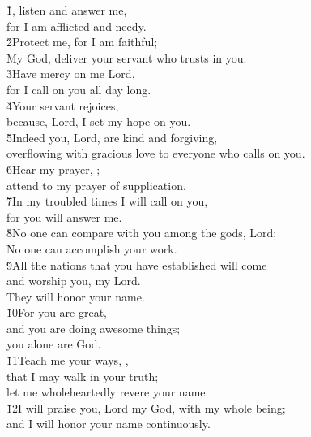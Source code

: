 \begin{poetry}
\poeml \v{1}, listen and answer me, \\
\poemll    for I am afflicted and needy. \\
\poeml \v{2}Protect me, for I am faithful; \\
\poemll    My God, deliver your servant who trusts in you. \\
\poeml \v{3}Have mercy on me Lord, \\
\poemll    for I call on you all day long. \\
\poeml \v{4}Your servant rejoices, \\
\poemll    because, Lord, I set my hope on you. \\
\poeml \v{5}Indeed you, Lord, are kind and forgiving, \\
\poemll    overflowing with gracious love to everyone who calls on you. \\
\poeml \v{6}Hear my prayer, ; \\
\poemll    attend to my prayer of supplication. \\
\poeml \v{7}In my troubled times I will call on you, \\
\poemll    for you will answer me. \\
\poeml \v{8}No one can compare with you among the gods, Lord; \\
\poemll    No one can accomplish your work. \\
\poeml \v{9}All the nations that you have established will come \\
\poemll    and worship you, my Lord. \\
\poemlll       They will honor your name. \\
\poeml \v{10}For you are great, \\
\poemll    and you are doing awesome things; \\
\poemlll       you alone are God. \\
\poeml \v{11}Teach me your ways, , \\
\poemll    that I may walk in your truth; \\
\poemlll       let me wholeheartedly revere your name. \\
\poeml \v{12}I will praise you, Lord my God, with my whole being; \\
\poemll    and I will honor your name continuously. \\

\end{poetry}
